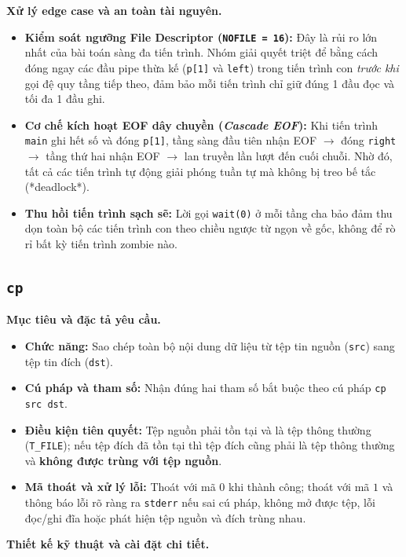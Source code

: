\documentclass[12pt,a4paper]{article}
\begin{document}
\textbf{Xử lý edge case và an toàn tài nguyên.}
\begin{itemize}
  \item \textbf{Kiểm soát ngưỡng File Descriptor (\texttt{NOFILE = 16}):} Đây là rủi ro lớn nhất của bài toán sàng đa tiến trình. Nhóm giải quyết triệt để bằng cách đóng ngay các đầu pipe thừa kế (\texttt{p[1]} và \texttt{left}) trong tiến trình con \textit{trước khi} gọi đệ quy tầng tiếp theo, đảm bảo mỗi tiến trình chỉ giữ đúng 1 đầu đọc và tối đa 1 đầu ghi.
  \item \textbf{Cơ chế kích hoạt EOF dây chuyền (\textit{Cascade EOF}):} Khi tiến trình \texttt{main} ghi hết số và đóng \texttt{p[1]}, tầng sàng đầu tiên nhận EOF $\to$ đóng \texttt{right} $\to$ tầng thứ hai nhận EOF $\to$ lan truyền lần lượt đến cuối chuỗi. Nhờ đó, tất cả các tiến trình tự động giải phóng tuần tự mà không bị treo bế tắc (*deadlock*).
  \item \textbf{Thu hồi tiến trình sạch sẽ:} Lời gọi \texttt{wait(0)} ở mỗi tầng cha bảo đảm thu dọn toàn bộ các tiến trình con theo chiều ngược từ ngọn về gốc, không để rò rỉ bất kỳ tiến trình zombie nào.
\end{itemize}

\subsection{\texttt{cp}}

\textbf{Mục tiêu và đặc tả yêu cầu.}
\begin{itemize}
  \item \textbf{Chức năng:} Sao chép toàn bộ nội dung dữ liệu từ tệp tin nguồn (\texttt{src}) sang tệp tin đích (\texttt{dst}).
  \item \textbf{Cú pháp và tham số:} Nhận đúng hai tham số bắt buộc theo cú pháp \texttt{cp src dst}.
  \item \textbf{Điều kiện tiên quyết:} Tệp nguồn phải tồn tại và là tệp thông thường (\texttt{T\_FILE}); nếu tệp đích đã tồn tại thì tệp đích cũng phải là tệp thông thường và \textbf{không được trùng với tệp nguồn}.
  \item \textbf{Mã thoát và xử lý lỗi:} Thoát với mã $0$ khi thành công; thoát với mã $1$ và thông báo lỗi rõ ràng ra \texttt{stderr} nếu sai cú pháp, không mở được tệp, lỗi đọc/ghi đĩa hoặc phát hiện tệp nguồn và đích trùng nhau.
\end{itemize}

\textbf{Thiết kế kỹ thuật và cài đặt chi tiết.}
\end{document}
